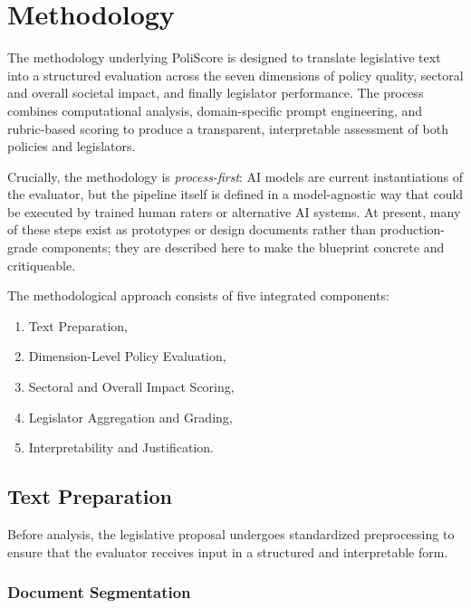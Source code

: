 \documentclass[12pt]{article}
\begin{document}

\section{Methodology}
\label{sec:methodology}

The methodology underlying PoliScore is designed to translate legislative text into a structured evaluation across the
seven dimensions of policy quality, sectoral and overall societal impact, and finally legislator performance. The process
combines computational analysis, domain-specific prompt engineering, and rubric-based scoring to produce a transparent,
interpretable assessment of both policies and legislators.

Crucially, the methodology is \emph{process-first}: AI models are current instantiations of the evaluator, but the pipeline
itself is defined in a model-agnostic way that could be executed by trained human raters or alternative AI systems. At
present, many of these steps exist as prototypes or design documents rather than production-grade components; they are
described here to make the blueprint concrete and critiqueable.

The methodological approach consists of five integrated components:

\begin{enumerate}
    \item Text Preparation,
    \item Dimension-Level Policy Evaluation,
    \item Sectoral and Overall Impact Scoring,
    \item Legislator Aggregation and Grading,
    \item Interpretability and Justification.
\end{enumerate}

\subsection{Text Preparation}

Before analysis, the legislative proposal undergoes standardized preprocessing to ensure that the evaluator receives input
in a structured and interpretable form.

\subsubsection{Document Segmentation}
\end{document}
